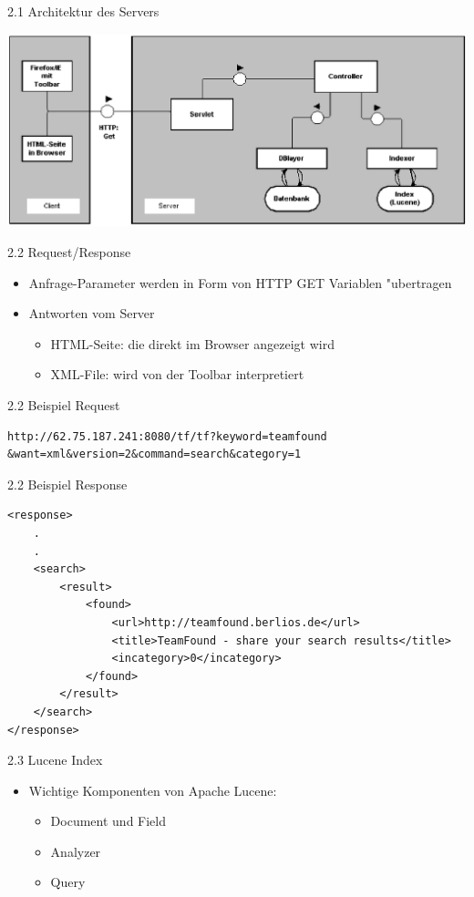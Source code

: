 \documentclass[landscape]{slides}
\begin{document}
%
%
%
\begin{slide}{2.1 Architektur des Servers}\\
\begin{center}
\includegraphics{bilder/aufbau2.eps}
\end{center}
\end{slide}
%
\begin{slide}{2.2 Request/Response }\\
\begin{itemize}
\item Anfrage-Parameter werden in Form von HTTP GET Variablen "ubertragen
\item Antworten vom Server
\begin{itemize}
\item HTML-Seite: die direkt im Browser angezeigt wird
\item XML-File: wird von der Toolbar interpretiert
\end{itemize}	
\end{itemize}
\end{slide}
%
\begin{slide}{2.2 Beispiel Request}\\
\begin{verbatim}
http://62.75.187.241:8080/tf/tf?keyword=teamfound
&want=xml&version=2&command=search&category=1
\end{verbatim}
\end{slide}
\begin{slide}{2.2 Beispiel Response }\\
\begin{verbatim}
<response>
	.
	.
	<search>	
		<result>
			<found>
				<url>http://teamfound.berlios.de</url>
				<title>TeamFound - share your search results</title>
				<incategory>0</incategory>
			</found>
		</result>
	</search>
</response>
\end{verbatim}
\end{slide}
%
\begin{slide}{2.3 Lucene Index}\\
\begin{itemize}
\item Wichtige Komponenten von Apache Lucene:
\begin{itemize}
\item Document und Field
\item Analyzer
\item Query
\end{itemize}
\end{itemize}
\end{slide}
\end{document}
